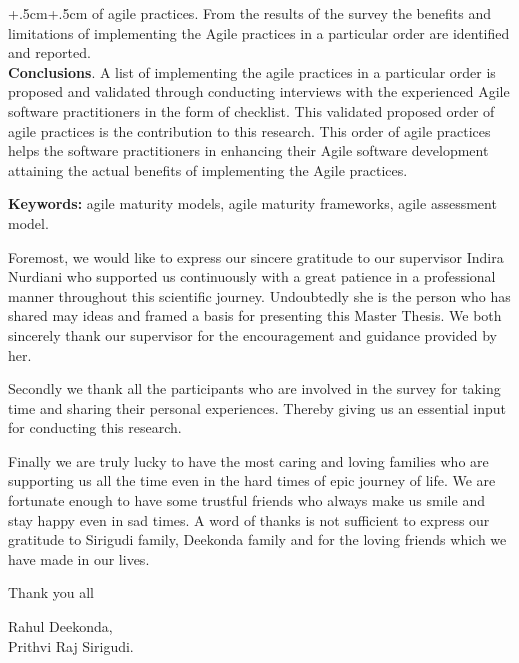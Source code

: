 \documentclass[a4paper,oneside]{bth}
\begin{document}
\begin{changemargin}{+.5cm}{+.5cm}
\newpage
		\setlength{\parindent}{0cm}
of agile practices. From the results of the survey the benefits and limitations of implementing the Agile practices in a particular order are identified and reported.\\
\textbf{Conclusions}. A list of implementing the agile practices in a particular order is proposed and validated through conducting interviews with the experienced Agile software practitioners in the form of checklist. This validated proposed order of agile practices is the contribution to this research. This order of agile practices helps the software practitioners in enhancing their Agile software development attaining the actual benefits of implementing the Agile practices.

\par\vspace {1cm}
\noindent
\textbf{Keywords:} agile maturity models, agile maturity frameworks, agile assessment model.

\end{changemargin}

\acknowledgments Foremost, we would like to express our sincere gratitude to our supervisor Indira Nurdiani who supported us continuously with a great patience in a professional manner throughout this scientific journey. Undoubtedly she is the person who has shared may ideas and framed a basis for presenting this Master Thesis. We both sincerely thank our supervisor for the encouragement and guidance provided by her.

Secondly we thank all the participants who are involved in the survey for taking time and sharing their personal experiences. Thereby giving us an essential input for conducting this research.

Finally we are truly lucky to have the most caring and loving families who are supporting us all the time even in the hard times of epic journey of life. We are fortunate enough to have some trustful friends who always make us smile and stay happy even in sad times. A word of thanks is not sufficient to express our gratitude to Sirigudi family, Deekonda family and for the loving friends which we have made in our lives.

Thank you all
\begin{flushright}
	Rahul Deekonda,\\
    Prithvi Raj Sirigudi.
\end{flushright}

\tableofcontents 
\listoftables
\listoffigures
\cleardoublepage
\pagestyle{headings}
\end{document}
